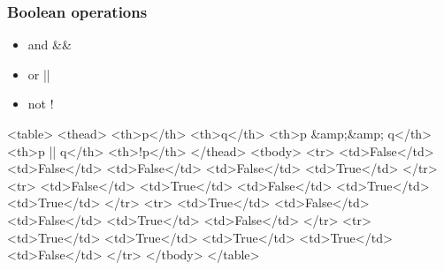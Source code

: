 \documentclass{../c-lecture}
\begin{document}
\begin{frame}
  \frametitle{Boolean operations}
  \begin{itemize}
    \item and \&\&
    \item or ||
    \item not !
  \end{itemize}
  <table>
    <thead>
      <th>p</th>
      <th>q</th>
      <th>p &amp;&amp; q</th>
      <th>p || q</th>
      <th>!p</th>
    </thead>
    <tbody>
      <tr>
        <td>False</td>
        <td>False</td>
        <td>False</td>
        <td>False</td>
        <td>True</td>
      </tr>
      <tr>
        <td>False</td>
        <td>True</td>
        <td>False</td>
        <td>True</td>
        <td>True</td>
      </tr>
      <tr>
        <td>True</td>
        <td>False</td>
        <td>False</td>
        <td>True</td>
        <td>False</td>
      </tr>
      <tr>
        <td>True</td>
        <td>True</td>
        <td>True</td>
        <td>True</td>
        <td>False</td>
      </tr>
    </tbody>
  </table>
\end{frame}
\end{document}
